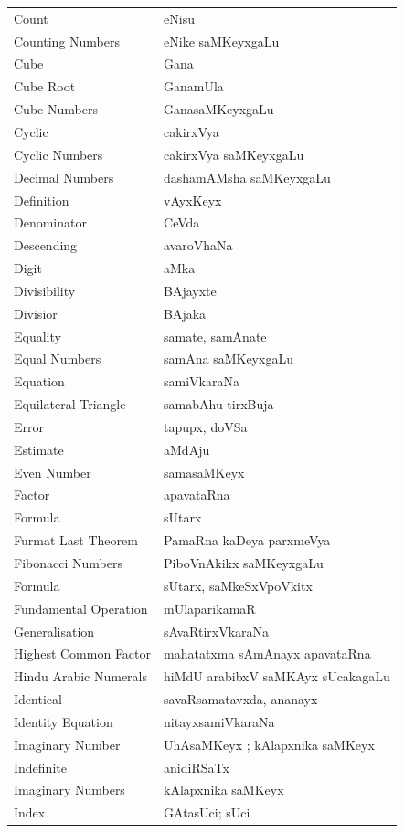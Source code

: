 \begin{longtable}{>{\rm}l@{\hspace{1.25cm}}l}
Count & eNisu\\
Counting Numbers & eNike saMKeyxgaLu\\
Cube & Gana\\
Cube Root & GanamUla\\
Cube Numbers & GanasaMKeyxgaLu\\
Cyclic & cakirxVya\\
Cyclic Numbers & cakirxVya saMKeyxgaLu\\
Decimal Numbers & dashamAMsha saMKeyxgaLu\\
Definition & vAyxKeyx\\
Denominator & CeVda\\
Descending & avaroVhaNa\\
Digit & aMka\\
Divisibility & BAjayxte\\
Divisior & BAjaka\\
Equality & samate, samAnate\\
Equal Numbers & samAna saMKeyxgaLu\\
Equation & samiVkaraNa\\
Equilateral Triangle & samabAhu tirxBuja\\
Error & tapupx, doVSa\\
Estimate & aMdAju\\
Even Number & samasaMKeyx\\
Factor & apavataRna\\
Formula & sUtarx\\
Furmat Last Theorem & PamaRna kaDeya parxmeVya\\
Fibonacci Numbers & PiboVnAkikx saMKeyxgaLu\\
Formula & sUtarx, saMkeSxVpoVkitx\\
Fundamental Operation & mUlaparikamaR\\
Generalisation & sAvaRtirxVkaraNa\\
Highest Common Factor & mahatatxma sAmAnayx apavataRna\\
Hindu Arabic Numerals & hiMdU arabibxV saMKAyx sUcakagaLu\\
Identical & savaRsamatavxda, ananayx\\
Identity Equation & nitayxsamiVkaraNa\\
Imaginary Number & UhAsaMKeyx ; kAlapxnika saMKeyx\\
Indefinite & anidiRSaTx\\
Imaginary Numbers & kAlapxnika saMKeyx\\
Index & GAtasUci; sUci\\

\end{longtable}

